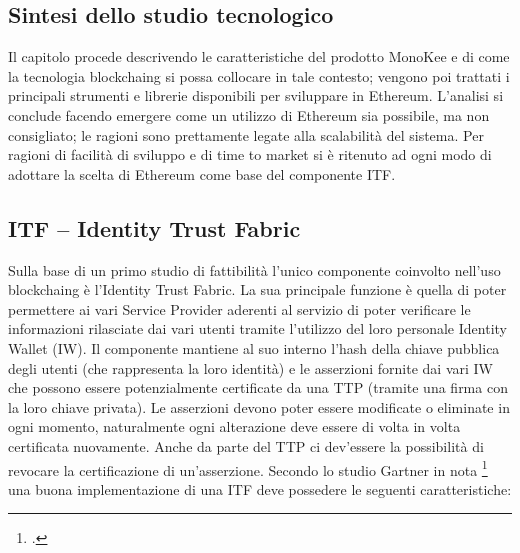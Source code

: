 \subsection{Sintesi dello studio tecnologico}
Il capitolo procede descrivendo le caratteristiche del prodotto MonoKee e di come la tecnologia \gls{blockchaing} si possa collocare in tale contesto; vengono poi trattati i principali strumenti e librerie disponibili per sviluppare in Ethereum. L’analisi si conclude facendo emergere come un utilizzo di Ethereum sia possibile, ma non consigliato; le ragioni sono prettamente legate alla scalabilità del sistema. Per ragioni di facilità di sviluppo e di time to market si è ritenuto ad ogni modo di adottare la scelta di Ethereum come base del componente ITF.

\subsection{ITF – Identity Trust Fabric}
Sulla base di un primo studio di fattibilità l’unico componente coinvolto nell’uso \gls{blockchaing} è l’Identity Trust Fabric. La sua principale funzione è quella di poter permettere ai vari Service Provider aderenti al servizio di poter verificare le informazioni rilasciate dai vari utenti tramite l’utilizzo del loro personale Identity Wallet (IW). Il componente mantiene al suo interno l’hash della chiave pubblica degli utenti (che rappresenta la loro identità) e le asserzioni fornite dai vari IW che possono essere potenzialmente certificate da una TTP (tramite una firma con la loro chiave privata). Le asserzioni devono poter essere modificate o eliminate in ogni momento, naturalmente ogni alterazione deve essere di volta in volta certificata nuovamente. Anche da parte del TTP ci dev’essere la possibilità di revocare la certificazione di un’asserzione. 
Secondo lo studio Gartner in nota \footcite{farah:The-Dawn-of-Decentralized-Identity} una buona implementazione di una ITF deve possedere le seguenti caratteristiche:
